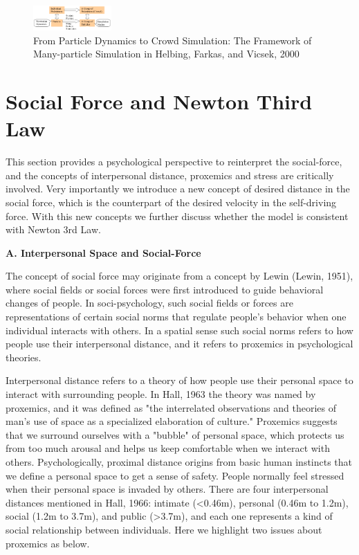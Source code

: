 \documentclass{article}
\begin{document}
%
\begin{figure}[tb]
  \centerline{\includegraphics[clip=true, width=30mm]{FIGURES/helbingFramework.png}}
  \caption{From Particle Dynamics to Crowd Simulation: The Framework of Many-particle Simulation in Helbing, Farkas, and Vicsek, 2000}\label{Fig_helbingFramework}
\end{figure}
%

	
\section{Social Force and Newton Third Law}

This section provides a psychological perspective to reinterpret the social-force, and the concepts of interpersonal distance, proxemics and stress are critically involved.  Very importantly we introduce a new concept of desired distance in the social force, which is the counterpart of the desired velocity in the self-driving force.  With this new concepts we further discuss whether the model is consistent with Newton 3rd Law.

\noindent \textbf{ A. Interpersonal Space and Social-Force}

The concept of social force may originate from a concept by Lewin (Lewin, 1951), where social fields or social forces were first introduced to guide behavioral changes of people.  In soci-psychology, such social fields or forces are representations of certain social norms that regulate people's behavior when one individual interacts with others.  In a spatial sense such social norms refers to how people use their interpersonal distance, and it refers to proxemics in psychological theories.

Interpersonal distance refers to a theory of how people use their personal space to interact with surrounding people.  In Hall, 1963 the theory was named by proxemics, and it was defined as "the interrelated observations and theories of man's use of space as a specialized elaboration of culture."  Proxemics suggests that we surround ourselves with a "bubble" of personal space, which protects us from too much arousal and helps us keep comfortable when we interact with others.  Psychologically, proximal distance origins from basic human instincts that we define a personal space to get a sense of safety.  People normally feel stressed when their personal space is invaded by others.  There are four interpersonal distances mentioned in Hall, 1966: intimate (<0.46m), personal (0.46m to 1.2m), social (1.2m to 3.7m), and public (>3.7m), and each one represents a kind of social relationship between individuals.  Here we highlight two issues about proxemics as below.
\end{document}
